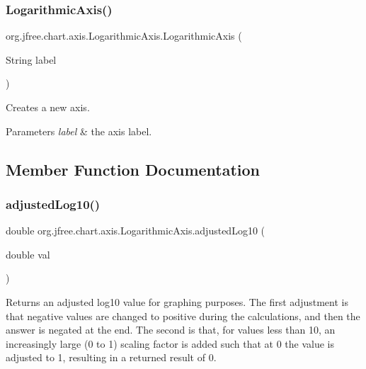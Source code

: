 \subsubsection{\texorpdfstring{Logarithmic\+Axis()}{LogarithmicAxis()}}
{\footnotesize\ttfamily org.\+jfree.\+chart.\+axis.\+Logarithmic\+Axis.\+Logarithmic\+Axis (\begin{DoxyParamCaption}\item[{String}]{label }\end{DoxyParamCaption})}

Creates a new axis.


\begin{DoxyParams}{Parameters}
{\em label} & the axis label. \\
\hline
\end{DoxyParams}


\subsection{Member Function Documentation}
\mbox{\label{classorg_1_1jfree_1_1chart_1_1axis_1_1_logarithmic_axis_a44a08184863352322f6fdf8923b60780}} 
\subsubsection{\texorpdfstring{adjusted\+Log10()}{adjustedLog10()}}
{\footnotesize\ttfamily double org.\+jfree.\+chart.\+axis.\+Logarithmic\+Axis.\+adjusted\+Log10 (\begin{DoxyParamCaption}\item[{double}]{val }\end{DoxyParamCaption})}

Returns an adjusted log10 value for graphing purposes. The first adjustment is that negative values are changed to positive during the calculations, and then the answer is negated at the end. The second is that, for values less than 10, an increasingly large (0 to 1) scaling factor is added such that at 0 the value is adjusted to 1, resulting in a returned result of 0.


